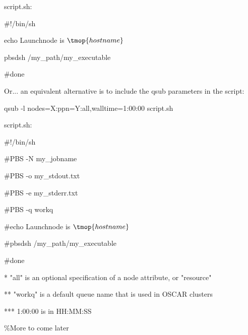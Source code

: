 \documentclass{letter}
\begin{document}
script.sh:

\#!/bin/sh

echo Launchnode is $\tmop{hostname}$

pbsdsh /my\_path/my\_executable

\#done



Or... an equivalent alternative is to include the qsub parameters in the
script:

qsub -l nodes=X:ppn=Y:all,walltime=1:00:00 script.sh

script.sh:

\#!/bin/sh

\#PBS -N my\_jobname

\#PBS -o my\_stdout.txt

\#PBS -e my\_stderr.txt

\#PBS -q workq

\#echo Launchnode is $\tmop{hostname}$

\#pbsdsh /my\_path/my\_executable

\#done

*    "all" is an optional specification of a node attribute, or "resource"

**  "workq" is a default queue name that is used in OSCAR clusters

*** 1:00:00 is in HH:MM:SS

\%More to come later
\end{document}
